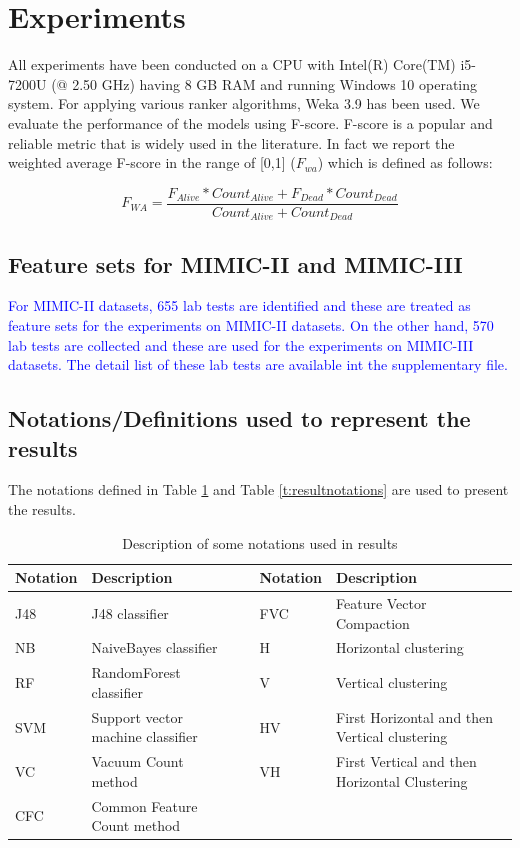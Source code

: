 \section{Experiments}\label{s:experiments}
All experiments have been conducted on a CPU with Intel(R) Core(TM) i5-7200U (@ 2.50 GHz) having 8 GB RAM and running Windows 10 operating system. For applying various ranker algorithms, Weka 3.9 \cite{weka} has been used. We evaluate the performance of the models using F-score. F-score is a popular and reliable metric that is widely used in the literature. In fact we report the weighted average F-score in the range of [0,1] ($F_{wa}$) which is defined as follows:

\begin{equation}
F_{WA} = \frac{F_{Alive} * Count_{Alive} +  F_{Dead} * Count_{Dead}}{Count_{Alive} + Count_{Dead}}
\end{equation} 

\subsection{Feature sets for MIMIC-II and MIMIC-III}
\textcolor{blue}{For MIMIC-II datasets, 655 lab tests are identified and these are treated as feature sets for the experiments on MIMIC-II datasets. On the other hand, 570 lab tests are collected and these are used for the experiments on MIMIC-III datasets. The detail list of these lab tests are available int the supplementary file.}
 
\subsection{Notations/Definitions used to represent the results}
The notations defined in Table \ref{t:resultnotations0} and Table \ref{t:resultnotations} are used to present the results.

\begin{table}[h] 
	\centering \caption{Description of some notations used in results} 
	\begin{tabular}{|p{1.25cm}|p{6cm}|p{0.2cm}|p{1.25cm}|p{6cm}|}\hline
		\textbf{Notation} & \textbf{Description} & & \textbf{Notation}  & \textbf{Description} \\\hline
		J48 & J48 classifier & & FVC & Feature Vector Compaction\\\hline
		NB & NaiveBayes classifier & & H & Horizontal clustering \\\hline
		RF & RandomForest classifier & & V & Vertical clustering \\\hline
		SVM & Support vector machine classifier & & HV & First Horizontal and then Vertical clustering \\\hline
		VC & Vacuum Count method & & VH & First Vertical and then Horizontal Clustering \\\hline
		CFC & Common Feature Count method & & & \\\hline  	
	\end{tabular}
	\label{t:resultnotations0}
\end{table}


